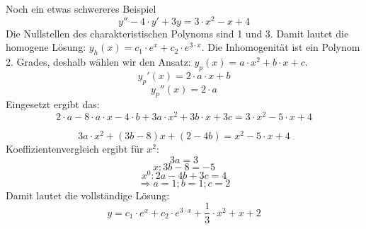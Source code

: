 \documentclass[
	11pt, %
]{beamer}
\begin{document}
\begin{frame}
	\begin{exampleblock}{Noch ein etwas schwereres Beispiel}
		\begin{equation}
			y''-4\cdot y'+3y=3\cdot x^2-x+4
		\end{equation}
		Die Nullstellen des charakteristischen Polynoms sind 1 und 3. Damit lautet die homogene L\"osung: $y_h(x)=c_1\cdot e^x+c_2\cdot e^{3\cdot x}$. Die Inhomogenit\"at ist ein Polynom 2. Grades, deshalb w\"ahlen wir den Ansatz: $y_p(x)=a\cdot x^2+b\cdot x+c$.
		\begin{equation}
			y_p'(x)=2\cdot a\cdot x+b
		\end{equation}
		\begin{equation}
			y_p''(x)=2\cdot a
		\end{equation}
		Eingesetzt ergibt das:
		\begin{equation}
			2\cdot a - 8\cdot a\cdot x-4\cdot b+3a\cdot x^2+3b\cdot x+3c = 3\cdot x^2-5\cdot x+4
		\end{equation}
	\end{exampleblock}
\end{frame}
\begin{frame}
	\begin{exampleblock}{}
		\begin{equation}
			3a\cdot x^2+(3b-8)x+(2-4b)=x^2-5\cdot x+4
		\end{equation}
		Koeffizientenvergleich ergibt f\"ur $x^2$:
		\begin{equation}
			3a=3
		\end{equation}
		\begin{equation}
			x: 3b-8=-5
		\end{equation}
		\begin{equation}
			x^0: 2a-4b+3c=4
		\end{equation}
		\begin{equation}
			\Rightarrow a=1; b=1; c=2
		\end{equation}
		Damit lautet die vollst\"andige L\"osung:
		\begin{equation}
		y=c_1\cdot e^x+c_2\cdot e^{3\cdot x}+\frac{1}{3}\cdot x^2+x+2
		\end{equation}
	\end{exampleblock}
\end{frame}
\end{document}
